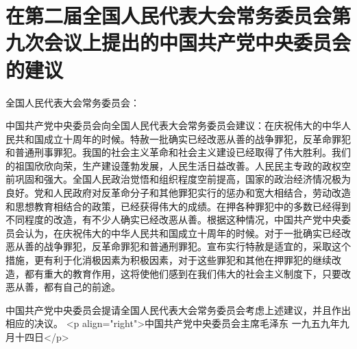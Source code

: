 \section[在第二届全国人民代表大会常务委员会第九次会议上提出的中国共产党中央委员会的建议（一九五九年九月十四日）]{在第二届全国人民代表大会常务委员会第九次会议上提出的中国共产党中央委员会的建议}


全国人民代表大会常务委员会：

中国共产党中央委员会向全国人民代表大会常务委员会建议：在庆祝伟大的中华人民共和国成立十周年的时候。特赦一批确实已经改恶从善的战争罪犯，反革命罪犯和普通刑事罪犯。我国的社会主义革命和社会主义建设已经取得了伟大胜利。我们的祖国欣欣向荣，生产建设蓬勃发展，人民生活日益改善。人民民主专政的政权空前巩固和强大。全国人民政治觉悟和组织程度空前提高，国家的政治经济情况极为良好。党和人民政府对反革命分子和其他罪犯实行的惩办和宽大相结合，劳动改造和思想教育相结合的政策，已经获得伟大的成绩。在押各种罪犯中的多数已经得到不同程度的改造，有不少人确实已经改恶从善。根据这种情况，中国共产党中央委员会认为，在庆祝伟大的中华人民共和国成立十周年的时候。对于一批确实已经改恶从善的战争罪犯，反革命罪犯和普通刑罪犯。宣布实行特赦是适宜的，采取这个措施，更有利于化消极因素为积极因素，对于这些罪犯和其他在押罪犯的继续改造，都有重大的教育作用，这将使他们感到在我们伟大的社会主义制度下，只要改恶从善，都有自己的前途。

中国共产党中央委员会提请全国人民代表大会常务委员会考虑上述建议，并且作出相应的决议。
<p align="right">中国共产党中央委员会主席毛泽东
一九五九年九月十四日</p>


